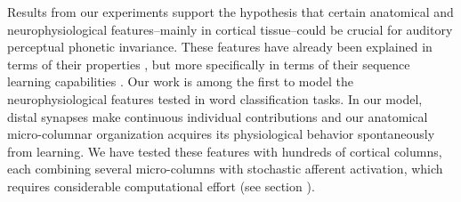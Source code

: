 \documentclass[10pt,letterpaper]{article}
\begin{document}
Results from our experiments support the hypothesis that certain anatomical and neurophysiological features--mainly in cortical tissue--could be crucial for auditory perceptual phonetic invariance.
These features have already been explained in terms of their properties
\cite{hawkins_2016},
but more
specifically
in terms of their sequence learning capabilities \cite{cui_2016}.
Our work is among the first to model
the neurophysiological features tested in word classification tasks. In our model,
distal synapses make continuous individual contributions and our anatomical micro-columnar organization acquires its physiological behavior spontaneously from learning.
We have tested these features with hundreds of cortical columns, each combining several micro-columns with stochastic afferent activation, which requires considerable computational effort (see section ).


\end{document}

